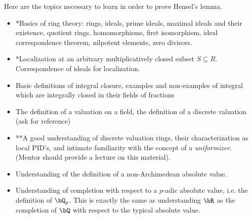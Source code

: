Here are the topics necessary to learn in order to prove Hensel's lemma.
\begin{itemize}
	\item *Basics of ring theory: rings, ideals, prime ideals, maximal ideals and their existence, quotient rings, homomorphisms, first isomorphism, ideal correspondence theorem, nilpotent elements, zero divisors.
	\item *Localization at an arbitrary multiplicatively closed subset $S\subseteq R$. Correspondence of ideals for localization.
	\item Basic definitions of integral closure, examples and non-examples of integral which are integrally closed in their fields of fractions
	\item The definition of a valuation on a field, the definition of a discrete valuation (ask for reference)
	\item **A good understanding of discrete valuation rings, their characterization as local PID's, and intimate familiarity with the concept of a \emph{uniformizer}. (Mentor should provide a lecture on this material).
	\item Understanding of the definition of a non-Archimedean absolute value.
	\item Understanding of completion with respect to a $p$-adic absolute value, i.e. the definition of $\bQ_p$. This is exactly the same as understanding $\bR$ as the completion of $\bQ$ with respect to the typical absolute value.
\end{itemize}

\printbibliography

